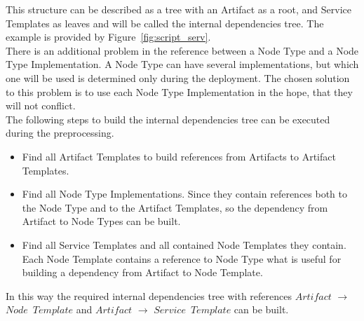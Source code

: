 This structure can be described as a tree with an Artifact as a root, and Service Templates as leaves and will be called the internal dependencies tree.
The example is provided by Figure~\ref{fig:script_serv}.\\
There is an additional problem in the reference between a Node Type and a Node Type Implementation.
A Node Type can have several implementations, but which one will be used is determined only during the deployment. 
The chosen solution to this problem is to use each Node Type Implementation in the hope, that they will not conflict.\\
The following steps to build the internal dependencies tree can be executed during the preprocessing.
\begin{itemize}
	\item Find all Artifact Templates to build references from Artifacts to Artifact Templates.
	\item Find all Node Type Implementations. 
		Since they contain references both to the Node Type and to the Artifact Templates, so the dependency from Artifact to Node Types can be built.
	\item Find all Service Templates and all contained Node Templates they contain. 
		Each Node Template contains a reference to Node Type what is useful for building a dependency from Artifact to Node Template.
\end{itemize} 
In this way the required internal dependencies tree with references $Artifact$ $\rightarrow$ $Node$~$Template$ and $Artifact$ $\rightarrow$ $Service$~$Template$ can be built.


